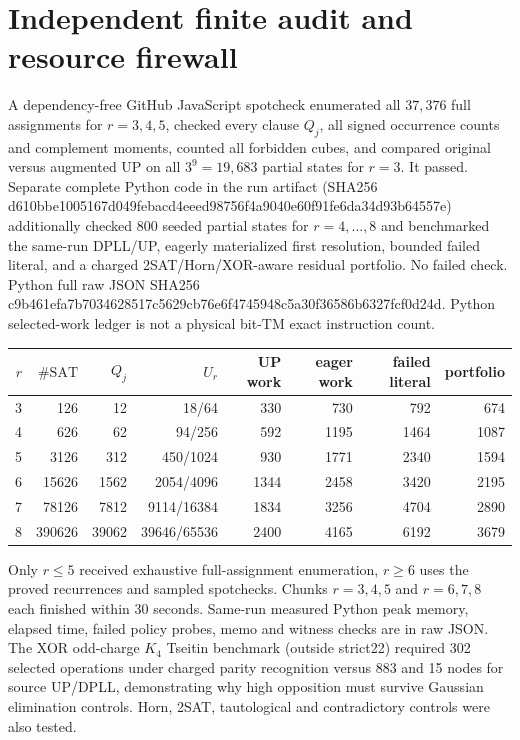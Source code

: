 \documentclass[10pt]{article}
\begin{document}
\section{Independent finite audit and resource firewall}
A dependency-free GitHub JavaScript spotcheck enumerated all $37{,}376$ full assignments for $r=3,4,5$, checked every clause $Q_j$, all signed occurrence counts and complement moments, counted all forbidden cubes, and compared original versus augmented UP on all $3^9=19{,}683$ partial states for $r=3$. It passed. Separate complete Python code in the run artifact (SHA256 d610bbe1005167d049febacd4eeed98756f4a9040e60f91fe6da34d93b64557e) additionally checked 800 seeded partial states for $r=4,\ldots,8$ and benchmarked the same-run DPLL/UP, eagerly materialized first resolution, bounded failed literal, and a charged 2SAT/Horn/XOR-aware residual portfolio. No failed check. Python full raw JSON SHA256 c9b461efa7b7034628517c5629cb76e6f4745948c5a30f36586b6327fcf0d24d. Python selected-work ledger is not a physical bit-TM exact instruction count.
\begin{center}\small
\begin{tabular}{rrrrrrrr}\toprule
$r$&$\#\mathrm{SAT}$&$Q_j$&$U_r$&UP work&eager work&failed literal&portfolio\\\midrule
3&126&12&18/64&330&730&792&674\\
4&626&62&94/256&592&1195&1464&1087\\
5&3126&312&450/1024&930&1771&2340&1594\\
6&15626&1562&2054/4096&1344&2458&3420&2195\\
7&78126&7812&9114/16384&1834&3256&4704&2890\\
8&390626&39062&39646/65536&2400&4165&6192&3679\\\bottomrule
\end{tabular}
\end{center}
Only $r\le5$ received exhaustive full-assignment enumeration, $r\ge6$ uses the proved recurrences and sampled spotchecks. Chunks $r=3,4,5$ and $r=6,7,8$ each finished within 30 seconds. Same-run measured Python peak memory, elapsed time, failed policy probes, memo and witness checks are in raw JSON. The XOR odd-charge $K_4$ Tseitin benchmark (outside strict22) required 302 selected operations under charged parity recognition versus 883 and 15 nodes for source UP/DPLL, demonstrating why high opposition must survive Gaussian elimination controls. Horn, 2SAT, tautological and contradictory controls were also tested.
\end{document}
